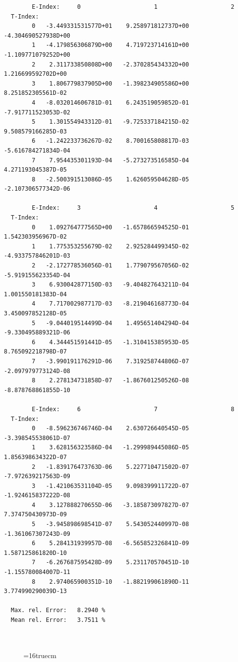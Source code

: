 \documentclass[12pt,dvips]{article}
\begin{document}
\begin{small}\begin{verbatim}
        E-Index:     0                     1                     2
  T-Index:
        0   -3.449331531577D+01    9.258971812737D+00   -4.304690527938D+00
        1   -4.179856306879D+00    4.719723714161D+00   -1.109771079252D+00
        2    2.311733850808D+00   -2.370285434332D+00    1.216699592702D+00
        3    1.806779837905D+00   -1.398234905586D+00    8.251852305561D-02
        4   -8.032014606781D-01    6.243519059852D-01   -7.917711523053D-02
        5    1.301554943312D-01   -9.725337184215D-02    9.508579166285D-03
        6   -1.242233736267D-02    8.700165808817D-03   -5.616784271834D-04
        7    7.954435301193D-04   -5.273273516585D-04    4.271193045387D-05
        8   -2.500391513086D-05    1.626059504628D-05   -2.107306577342D-06

        E-Index:     3                     4                     5
  T-Index:
        0    1.092764777565D+00   -1.657866594525D-01    1.542303956967D-02
        1    1.775353255679D-02    2.925284499345D-02   -4.933757846201D-03
        2   -2.172778536056D-01    1.779079567056D-02   -5.919155623354D-04
        3    6.930042877150D-03   -9.404827643211D-04    1.001550181383D-04
        4    7.717002987717D-03   -8.219046168773D-04    3.450097852128D-05
        5   -9.044019514499D-04    1.495651404294D-04   -9.330495889321D-06
        6    4.344451591441D-05   -1.310415385953D-05    8.765092218798D-07
        7   -3.990191176291D-06    7.319258744806D-07   -2.097979773124D-08
        8    2.278134731858D-07   -1.867601250526D-08   -8.878768861855D-10

        E-Index:     6                     7                     8
  T-Index:
        0   -8.596236746746D-04    2.630726640545D-05   -3.398545538061D-07
        1    3.628156323586D-04   -1.299989445086D-05    1.856398634322D-07
        2   -1.839176473763D-06    5.227710471502D-07   -7.972639217563D-09
        3   -1.421063531104D-05    9.098399911722D-07   -1.924615837222D-08
        4    3.127888270655D-06   -3.185873097827D-07    7.374750430973D-09
        5   -3.945898698541D-07    5.543052440997D-08   -1.361067307243D-09
        6    5.284131939957D-08   -6.565852326841D-09    1.587125861820D-10
        7   -6.267687595428D-09    5.231170570451D-10   -1.155780084007D-11
        8    2.974065900351D-10   -1.882199061890D-11    3.774990290039D-13

  Max. rel. Error:   8.2940 %
  Mean rel. Error:   3.7511 %



\end{verbatim}\end{small}
\begin{figure} \label{2.3.6rl}
\epsfxsize=16truecm
\end{figure}
\end{document}
